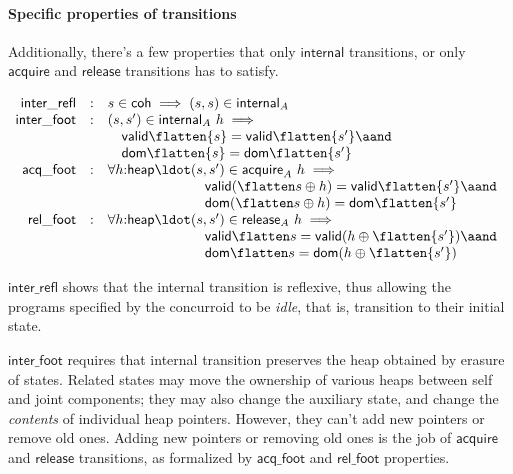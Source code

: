 \paragraph{Specific properties of transitions}

Additionally, there's a few properties that only $\mathsf{internal}$
transitions, or only $\mathsf{acquire}$ and $\mathsf{release}$
transitions has to satisfy.

\[
\begin{array}{rcl}
\mathsf{inter\_refl} & : & s \in \mathsf{coh} \implies (s, s) \in \mathsf{internal}_A\\
\mathsf{inter\_foot} & : & \!\!\!\begin{array}[t]{l}
           (s, s') \in \mathsf{internal}_A\ h \implies \hbox{}\\
           \quad \mathsf{valid} \flatten{s} = \mathsf{valid} \flatten{s'} \aand \hbox{}\\
           \quad \mathsf{dom} \flatten{s} = \mathsf{dom} \flatten{s'}
           \end{array}\\
\mathsf{acq\_foot} & : & \forall h{:}\mathsf{heap}\ldot \!\!\!\begin{array}[t]{l}
           (s, s') \in \mathsf{acquire}_A\ h \implies \hbox{}\\
           \quad \mathsf{valid} (\flatten s \oplus h) = \mathsf{valid} \flatten{s'} \aand \hbox{}\\
           \quad \mathsf{dom} (\flatten s \oplus h) = \mathsf{dom} \flatten{s'}
           \end{array}\\
\mathsf{rel\_foot} & : & \forall h{:}\mathsf{heap}\ldot \!\!\!\begin{array}[t]{l}
           (s, s') \in \mathsf{release}_A\ h \implies \hbox{}\\
           \quad \mathsf{valid} {\flatten s} = \mathsf{valid} (h \oplus \flatten{s'}) \aand \hbox{}\\
           \quad \mathsf{dom} {\flatten s} = \mathsf{dom} (h \oplus \flatten{s'})
           \end{array}
\end{array}
\]

$\mathsf{inter\_refl}$ shows that the internal transition is
reflexive, thus allowing the programs specified by the concurroid to
be \emph{idle}, that is, transition to their initial state.

$\mathsf{inter\_foot}$ requires that internal transition preserves the
heap obtained by erasure of states. Related states may move the
ownership of various heaps between self and joint components; they may
also change the auxiliary state, and change the \emph{contents} of
individual heap pointers. However, they can't add new pointers or
remove old ones. Adding new pointers or removing old ones is the job
of $\mathsf{acquire}$ and $\mathsf{release}$ transitions, as
formalized by $\mathsf{acq\_foot}$ and $\mathsf{rel\_foot}$
properties.


